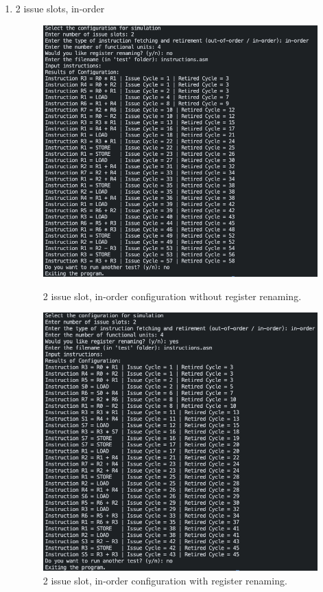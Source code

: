 \documentclass{article}
\begin{document}
\begin{enumerate}
    \item 2 issue slots, in-order 
    \begin{figure}[H]
        \centering 
        \begin{minipage}[t]{0.45\textwidth}
            \centering
            \includegraphics[width=\textwidth]{Images/Config3.png}
            \caption{2 issue slot, in-order configuration without register renaming.}
        \end{minipage}
        \hfill
        \begin{minipage}[t]{0.45\textwidth}
            \centering 
            \includegraphics[width=\textwidth]{Images/Config3_Renaming.png}
            \caption{2 issue slot, in-order configuration with register renaming.}
        \end{minipage}
    \end{figure}


\end{enumerate}
\end{document}
